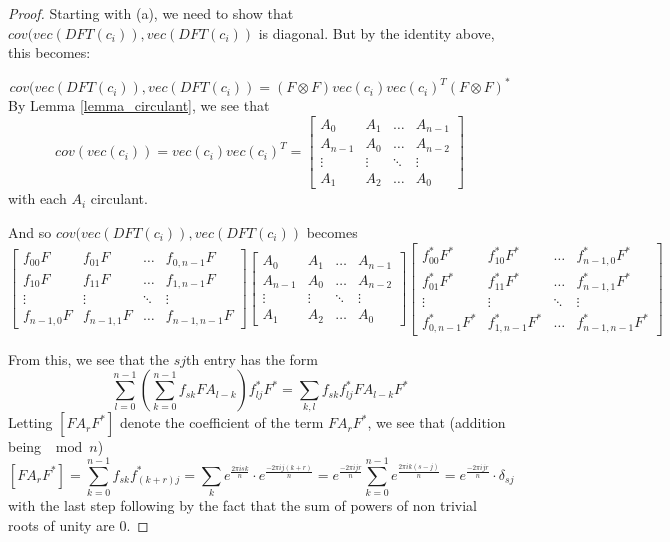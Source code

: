 \documentclass{article} %
\begin{document}
\begin{proof}
Starting with (a), we need to show that $cov(vec(DFT(c_i)), vec(DFT(c_i))$ is diagonal. But by the identity above, this becomes:

\[ cov(vec(DFT(c_i)), vec(DFT(c_i)) = (F \otimes F) vec(c_i) vec(c_i)^T (F \otimes F)^* \]
By Lemma \ref{lemma_circulant}, we see that
\[
cov(vec(c_i)) = vec(c_i) vec(c_i)^T =
\begin{bmatrix}
    A_0 & A_1  &  \hdots & A_{n-1} \\
    A_{n-1} & A_0 & \hdots & A_{n-2} \\
    \vdots & \vdots & \ddots & \vdots \\
     A_1 & A_2 & \hdots & A_0
\end{bmatrix}
\]
with each $A_i$ circulant.

And so $cov(vec(DFT(c_i)), vec(DFT(c_i))$ becomes
\[
\begin{bmatrix}
    f_{00}F & f_{01}F  &  \hdots & f_{0,n-1}F \\
    f_{10} F & f_{11} F & \hdots & f_{1,n-1}F \\
    \vdots & \vdots & \ddots & \vdots \\
     f_{n-1, 0}F & f_{n-1,1}F & \hdots & f_{n-1,n-1}F
\end{bmatrix}
\begin{bmatrix}
    A_0 & A_1  &  \hdots & A_{n-1} \\
    A_{n-1} & A_0 & \hdots & A_{n-2} \\
    \vdots & \vdots & \ddots & \vdots \\
     A_1 & A_2 & \hdots & A_0
\end{bmatrix}
\begin{bmatrix}
    f_{00}^*F^* & f_{10}^*F^*  &  \hdots & f_{n-1,0}^*F^* \\
    f_{01}^* F^* & f_{11}^* F^* & \hdots & f_{n-1,1}^*F^* \\
    \vdots & \vdots & \ddots & \vdots \\
     f_{ 0,n-1}^*F^* & f_{1,n-1}^*F^* & \hdots & f_{n-1,n-1}^*F^*
\end{bmatrix}
\]

From this, we see that the $sj$th entry has the form
\[ \sum_{l=0}^{n-1} \left( \sum_{k=0}^{n-1} f_{sk} F A_{l -k} \right)f^*_{lj} F^* = \sum_{k, l} f_{sk}f^*_{lj} F A_{l-k} F^* \]
Letting $[FA_r F^*]$ denote the coefficient of the term $FA_rF^*$, we see that (addition being $\mod n$)
\[ [FA_r F^*] = \sum_{k=0}^{n-1} f_{sk}f^*_{(k+r)j} = \sum_k e^{\frac{2 \pi i s k}{n}} \cdot e^{\frac{ - 2 \pi ij (k + r)}{n}} =  e^{\frac{ - 2 \pi ij r}{n}} \sum_{k=0}^{n-1} e^{\frac{2 \pi i k(s - j) }{n}} =  e^{\frac{ - 2 \pi ij r}{n}} \cdot \delta_{sj}   \]
with the last step following by the fact that the sum of powers of non trivial roots of unity are $0$.


\end{proof}
\end{document}
